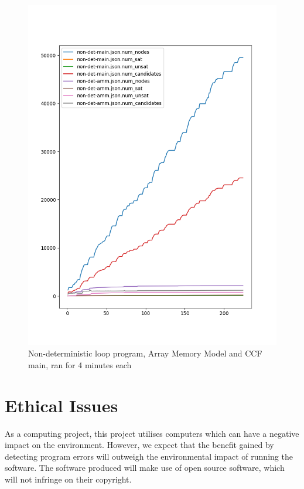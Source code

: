 \documentclass[12pt,twoside]{report}
\begin{document}
\begin{figure}
    \centering
    \includegraphics{figures/non-det.png}
    \caption{Non-deterministic loop program, Array Memory Model and CCF main, ran for 4 minutes each}
    \label{fig:enter-label}
\end{figure}

\chapter{Ethical Issues}

 As a computing project, this project utilises computers which can have a negative impact on the environment. However, we expect that the benefit gained by detecting program errors will outweigh the environmental impact of running the software. The software produced will make use of open source software, which will not infringe on their copyright.
\end{document}
